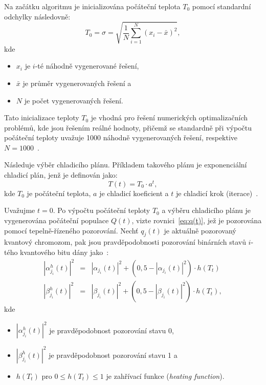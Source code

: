 Na začátku algoritmu je inicializována počáteční teplota $T_0$ pomocí standardní odchylky následovně:
\begin{equation}\label{eq:qisa-T0}
    T_0 = \sigma = \sqrt{\frac{1}{N}\sum_{i=1}^{N}\left(x_i - \bar{x}\right)^2},
\end{equation}
kde
\begin{itemize}
    \item $x_i$ je $i$-té náhodně vygenerované řešení,
    \item $\bar{x}$ je průměr vygenerovaných řešení a
    \item $N$ je počet vygenerovaných řešení.
\end{itemize}
Tato inicializace teploty $T_0$ je vhodná pro řešení numerických optimalizačních problémů, kde jsou řešením reálné hodnoty, přičemž se standardně při výpočtu počáteční teploty uvažuje 1000 náhodně vygenerovaných řešení, respektive $N=1000$~\cite{qisa,FundamentalsOfProbability}.

Následuje výběr chladicího plánu. Příkladem takového plánu je exponenciální chladicí plán, jenž je definován jako:
\begin{equation*}
    T\left(t\right) = T_0 \cdot a^t,
\end{equation*}
kde $T_0$ je počáteční teplota, $a$ je chladicí koeficient a $t$ je chladicí krok (iterace)~\cite{qisa}. 

Uvažujme $t= 0$. Po výpočtu počáteční teploty $T_0$ a výběru chladicího plánu je vygenerována počáteční populace $Q\left(t\right)$, vizte rovnici~\ref{eq:q(t)}, jež je pozorována pomocí tepelně-řízeného pozorování. 
Nechť $q_j\left(t\right)$ je aktuálně pozorovaný kvantový chromozom, pak jsou pravděpodobnosti pozorování binárních stavů $i$-tého kvantového bitu dány jako~\cite{qisa}:
\begin{eqnarray*}
    \left|\alpha_{j_i}^h\left(t\right)\right|^2 &=& \left|\alpha_{j_i}\left(t\right)\right|^2 + \left(0,5 - \left|\alpha_{j_i}\left(t\right)\right|^2\right) \cdot h\left(T_t\right) \\
    \left|\beta_{j_i}^h\left(t\right) \right|^2 &=& \left|\beta_{j_i}\left(t\right) \right|^2 + \left(0,5 - \left|\beta_{j_i}\left(t\right) \right|^2\right) \cdot h\left(T_t\right),
\end{eqnarray*}
kde 
\begin{itemize}
    \item $\left|\alpha_{j_i}^h\left(t\right)\right|^2$ je pravděpodobnost pozorování stavu 0,
    \item $\left|\beta_{j_i}^h\left(t\right)\right|^2$ je pravděpodobnost pozorování stavu 1 a
    \item $h\left(T_t\right)$ pro $0 \leq h\left(T_t\right) \leq 1$ je zahřívací funkce (\emph{heating function}). 
\end{itemize}


